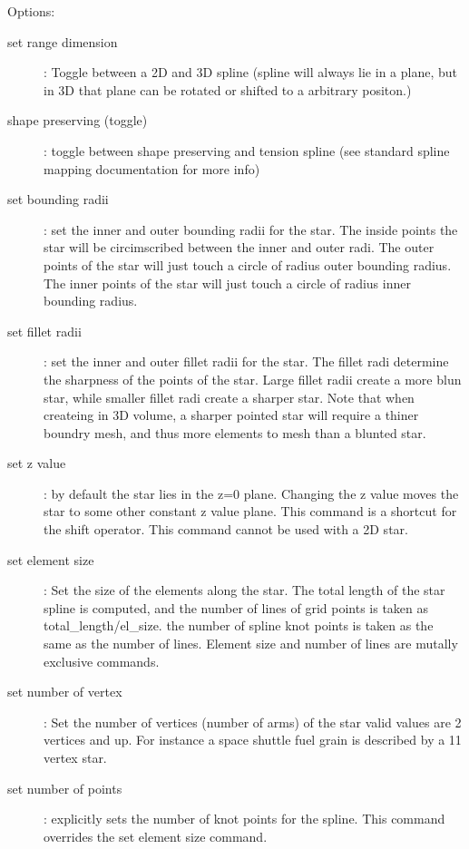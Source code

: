 Options:
\begin{description}
  \item[set range dimension] : Toggle between a 2D and 3D spline (spline will always lie in a plane,
    but in 3D that plane can be rotated or shifted to a arbitrary positon.)
  \item[shape preserving (toggle)] : toggle between shape preserving and tension spline (see standard
    spline mapping documentation for more info)
  \item[set bounding radii] : set the inner and outer bounding radii for the star.  The inside points
    the star will be circimscribed between the inner and outer radi.  The outer points of the star will
    just touch a circle of radius outer bounding radius.  The inner points of the star will just touch
    a circle of radius inner bounding radius.
  \item[set fillet radii] : set the inner and outer fillet radii for the star.  The fillet radi
    determine the sharpness of the points of the star.  Large fillet radii create a more blun star, while
    smaller fillet radi create a sharper star.  Note that when createing in 3D volume, a sharper pointed
    star will require a thiner boundry mesh, and thus more elements to mesh than a blunted star.
  \item[set z value] : by default the star lies in the z=0 plane.  Changing the z value moves the  
    star to some other constant z value plane.  This command is a shortcut for the shift operator.  This
    command cannot be used with a 2D star.
  \item[set element size] : Set the size of the elements along the star.  The total length of the
    star spline is computed, and the number of lines of grid points is taken as total\_length/el\_size.
    the number of spline knot points is taken as the same as the number of lines.  Element size and
    number of lines are mutally exclusive commands.
 \item[set number of vertex] : Set the number of vertices (number of arms) of the star valid values
   are 2 vertices and up.  For instance a space shuttle fuel grain is described by a 11 vertex star.
 \item[set number of points] : explicitly sets the number of knot points for the spline.  This
  command overrides the set element size command.
\end{description}



